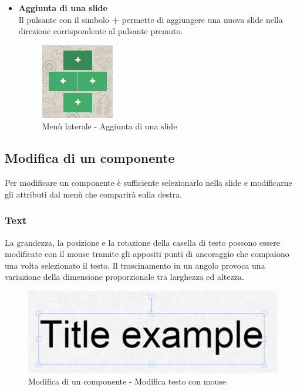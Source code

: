 \begin{itemize}
 
 
\item \textbf{Aggiunta di una slide}\\
 Il pulsante con il simbolo \textbf{+} permette di aggiungere una nuova slide nella direzione corrispondente al pulsante premuto.
 \begin{figure}[h] 
 	\centering 
 	\includegraphics[scale=0.80] {img/editor_add.png}
 	\caption{Menù laterale - Aggiunta di una slide} 
 \end{figure}

\end{itemize}


\newpage

\subsection{Modifica di un componente}
Per modificare un componente è sufficiente selezionarlo nella \gls{slide} e modificarne gli attributi dal menù che comparirà sulla destra.

\subsubsection{Text}
La grandezza, la posizione e la rotazione della casella di testo possono essere modificate con il mouse tramite gli appositi punti di ancoraggio che compaiono una volta selezionato il testo. Il trascinamento in un angolo provoca una variazione della dimensione proporzionale tra larghezza ed altezza.

\begin{figure}[H] 
	\centering 
	\includegraphics[scale=0.80] {img/text_anchor.png}
	\caption{Modifica di un componente - Modifica testo con mouse} 
\end{figure}

